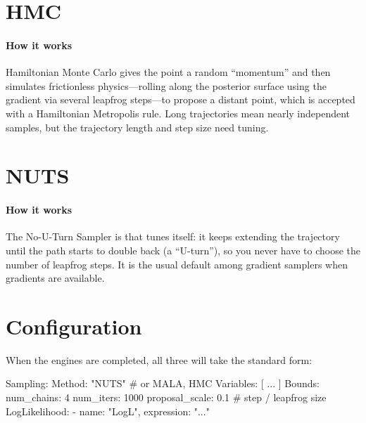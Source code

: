 \section{HMC}
\label{sec:s-hmc}

\paragraph{How it works} Hamiltonian Monte Carlo gives the point a random ``momentum'' and then
simulates frictionless physics---rolling along the posterior surface using the gradient via several
leapfrog steps---to propose a distant point, which is accepted with a Hamiltonian Metropolis rule.
Long trajectories mean nearly independent samples, but the trajectory length and step size need
tuning.

\section{NUTS}
\label{sec:s-nuts}

\paragraph{How it works} The No-U-Turn Sampler\cite{Hoffman:2011ukg} is  that tunes
itself: it keeps extending the trajectory until the path starts to double back (a ``U-turn''), so
you never have to choose the number of leapfrog steps. It is the usual default among gradient
samplers when gradients are available.

\section{Configuration}
\label{sec:grad-format}

When the engines are completed, all three will take the standard form:

\begin{yamlwin}
Sampling:
  Method: "NUTS"          # or MALA, HMC
  Variables: [ ... ]
  Bounds:
    num_chains: 4
    num_iters: 1000
    proposal_scale: 0.1   # step / leapfrog size
  LogLikelihood:
    - {name: "LogL", expression: "..."}
\end{yamlwin}
